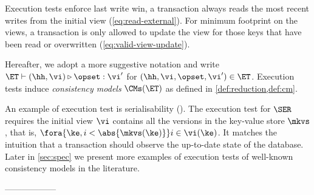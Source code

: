 Execution tests enforce last write win,
\ie a transaction always reads the most recent writes from the initial view (\cref{eq:read-external}).
For minimum footprint on the views, a transaction is only allowed to update the view for those keys that have been read or overwritten (\cref{eq:valid-view-update}).


Hereafter, we adopt a more suggestive notation and write $\ET \vdash (\hh, \vi) \triangleright \opset: \vi'$ 
for $(\hh, \vi, \opset, \vi') \in \ET$.
Execution tests induce \emph{consistency models} \( \CMs(\ET) \) as defined in \cref{def:reduction,def:cm}.

An example of execution test is serialisability (\SER).
The execution test for \( \SER \) requires the initial view  \( \vi \) contains all the versions in the key-value store \( \mkvs \), that is, \( \fora{\ke, i < \abs{\mkvs(\ke)} } i \in \vi(\ke)\).
It matches the intuition that a transaction should observe the up-to-date state of the database.
Later in \cref{sec:spec} we present more examples of execution tests of well-known consistency models in the literature. 



------------------


